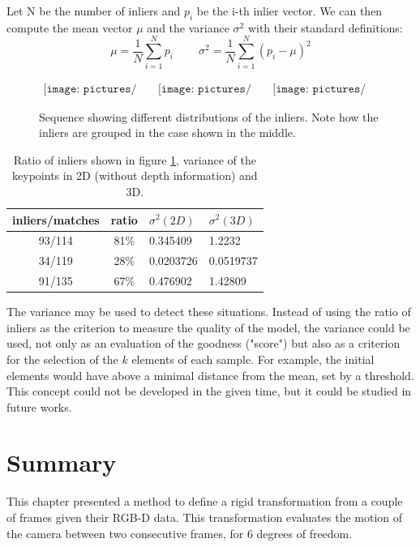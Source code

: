 Let N be the number of inliers and $p_i$ be the i-th inlier vector. We can then compute the mean vector $\mu$ and the variance $\sigma^2$ with their standard definitions:
\[
\mu = \frac{1}{N} \sum_{i=1}^N{p_i}
\;\;\;\;\;\;\;\;
\sigma^2 = \frac{1}{N} \sum_{i=1}^N{(p_i - \mu)^2}
\]

\begin{figure}[H]
\centering$
 \begin{array}{ccc}
 \texttt{[image: pictures/bad\_transform1]} &
 \texttt{[image: pictures/bad\_transform2]} &
 \texttt{[image: pictures/bad\_transform3]}
 \end{array}$
\caption{Sequence showing different distributions of the inliers. Note how the inliers are grouped in the case shown in the middle.}
\label{fig:bad_transform}
\end{figure}

\begin{table}[h]
\begin{center}
\begin{tabular}{ccll}
 inliers/matches & ratio & $\sigma^2(2D)$ & $\sigma^2(3D)$\\
 \hline
 93/114 &	81\% &	0.345409 &	1.2232\\
 34/119 &	28\% &	0.0203726 &	0.0519737\\
 91/135 &	67\% &	0.476902 &	1.42809\\
\end{tabular}
\end{center}
\caption{Ratio of inliers shown in figure \ref{fig:bad_transform}, variance of the keypoints in 2D (without depth information) and 3D.}
\end{table}

The variance may be used to detect these situations. Instead of using the ratio of inliers as the criterion to measure the quality of the model, the variance could be used, not only as an evaluation of the goodness ("score") but also as a criterion for the selection of the $k$ elements of each sample. For example, the initial elements would have above a minimal distance from the mean, set by a threshold. This concept could not be developed in the given time, but it could be studied in future works. 

\section{Summary}

This chapter presented a method to define a rigid transformation from a couple of frames given their RGB-D data. This transformation evaluates the motion of the camera between two consecutive frames, for 6 degrees of freedom.

